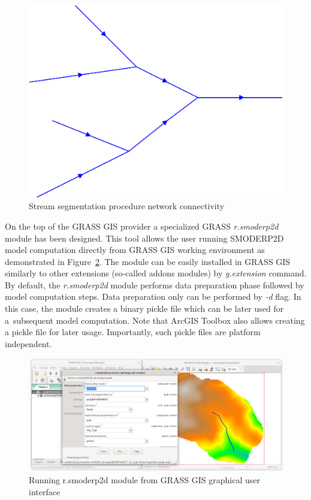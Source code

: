 \begin{figure}[ht!]
  \begin{center}
    \includegraphics[width=0.6\columnwidth]{figures/stream_next_edge}
    \caption{Stream segmentation procedure network connectivity}
    \label{fig:stream_next_edge}
  \end{center}
\end{figure}

On the top of the GRASS GIS provider a specialized GRASS {\em r.smoderp2d}
module has been designed. This tool allows the user running SMODERP2D
model computation directly from GRASS GIS working environment as
demonstrated in Figure~\ref{fig:r.smoderp2d}. The module can be easily
installed in GRASS GIS similarly to other extensions (so-called addons
modules) by {\em g.extension} command. By default, the {\em
  r.smoderp2d} module performs data preparation phase followed by
model computation steps. Data preparation only can be performed by
{\em -d} flag. In this case, the module creates a binary pickle file
which can be later used for a~subsequent model computation. Note that
ArcGIS Toolbox also allows creating a pickle file for later
usage. Importantly, such pickle files are platform independent.

\begin{figure}[ht!]
  \begin{center}
    \includegraphics[width=1.0\columnwidth]{figures/smoderp2d_grass.png}
    \caption{Running r.smoderp2d module from GRASS GIS graphical user interface}
    \label{fig:r.smoderp2d}
  \end{center}
\end{figure}

